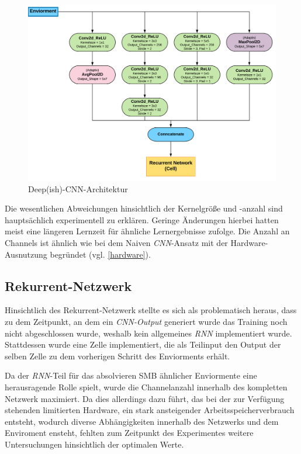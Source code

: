 \documentclass[sigconf,nonacm]{acmart}
\begin{document}
\begin{figure}[hbt!]
\includegraphics[angle=90,height=\columnwidth]{Netzwerk_Architektur_dcn.png}
\caption{Deep(ish)-CNN-Architektur}
\end{figure}
Die wesentlichen Abweichungen hinsichtlich der Kernelgröße und -anzahl sind hauptsächlich experimentell zu erklären. Geringe Änderungen hierbei hatten meist eine längeren Lernzeit für ähnliche Lernergebnisse zufolge. Die Anzahl an Channels ist ähnlich wie bei dem Naiven \textit{CNN}-Ansatz mit der Hardware-Ausnutzung begründet (vgl. \ref{hardware}).

\subsection{Rekurrent-Netzwerk}
Hinsichtlich des Rekurrent-Netzwerk stellte es sich als problematisch heraus, dass zu dem Zeitpunkt, an dem ein \textit{CNN-Output} generiert wurde das Training noch nicht abgeschlossen wurde, weshalb kein allgemeines \textit{RNN} implementiert wurde. Stattdessen wurde eine Zelle implementiert, die als Teilinput den Output der selben Zelle zu dem vorherigen Schritt des Enviorments erhält.

Da der \textit{RNN}-Teil für das absolvieren SMB ähnlicher Enviormente eine herausragende Rolle spielt, wurde die Channelanzahl innerhalb des kompletten Netzwerk maximiert. Da dies allerdings dazu führt, das bei der zur Verfügung stehenden limitierten Hardware, ein stark ansteigender Arbeitsspeicherverbrauch entsteht, wodurch diverse Abhängigkeiten innerhalb des Netzwerks und dem Enviroment ensteht, fehlten zum Zeitpunkt des Experimentes weitere Untersuchungen hinsichtlich der optimalen Werte.
\end{document}
